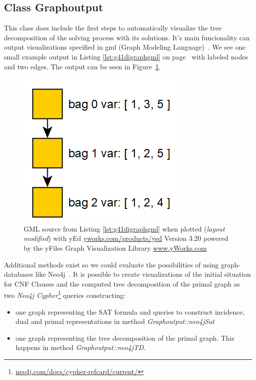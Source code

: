\documentclass[a4paper, 12pt, bibliography=totoc]{scrartcl}
\begin{document}
\subsection{Class Graphoutput}\label{sec:chagraphoutput}
This class does include the first steps to automatically visualize the tree decomposition of the solving process with its solutions.
It's main funcionality can output visualizations specified in gml (Graph Modeling Language)~\cite{Himsolt2010GMLAP}. We see one small example output in Listing \ref{lst:g41digraphgml} on page~\pageref{lst:g41digraphgml} with labeled nodes and two edges. The output can be seen in Figure~\ref{fig:gmlexamplepic}.

\begin{figure}[h]
	\centering
	\includegraphics[]{images/gmlexamplepic.png}
	\caption{GML source from Listing \ref{lst:g41digraphgml} when plotted (\textit{layout modified}) with yEd {\url{yworks.com/products/yed} Version 3.20 powered by the yFiles Graph Visualization Library \url{www.yWorks.com}} }
	\label{fig:gmlexamplepic}
\end{figure}
Additional methods exist so we could evaluate the possibilities of using graph-databases like Neo4j~\cite{graphdatabases}.
It is possible to create visualizations of the initial situation for CNF Clauses and the computed tree decomposition of the primal graph as two \textit{Neo4j Cypher}\footnote{\url{neo4j.com/docs/cypher-refcard/current/}} queries constructing:
\begin{itemize}[label=-]
	\item one graph representing the SAT formula and queries to construct incidence, dual and primal representations in method \textit{Graphoutput::neo4jSat}
	\item one graph representing the tree decomposition of the primal graph. This happens in method \textit{Graphoutput::neo4jTD}.
\end{itemize}
\end{document}
